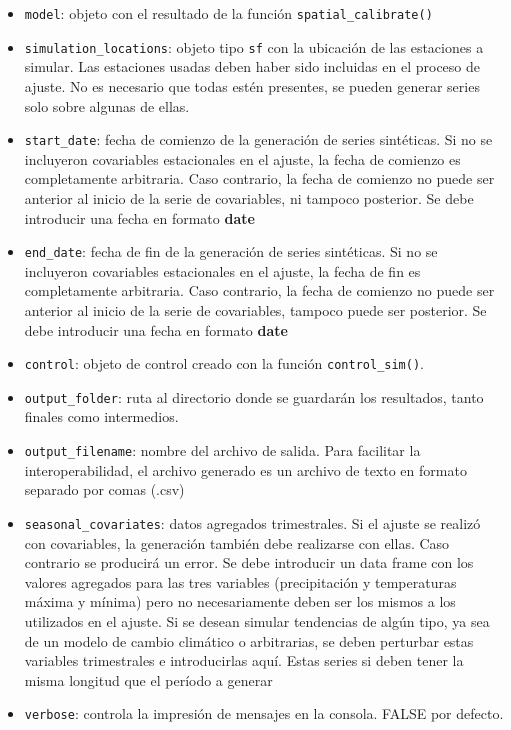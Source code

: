 \documentclass[
  12pt]{article}
\providecommand{\tightlist}{%
  \setlength{\itemsep}{0pt}\setlength{\parskip}{0pt}}
\begin{document}
\begin{itemize}
\tightlist
\item
  \texttt{model}: objeto con el resultado de la función \texttt{spatial\_calibrate()}
\item
  \texttt{simulation\_locations}: objeto tipo \texttt{sf} con la ubicación de las estaciones a simular. Las estaciones usadas deben haber sido incluidas en el proceso de ajuste. No es necesario que todas estén presentes, se pueden generar series solo sobre algunas de ellas.
\item
  \texttt{start\_date}: fecha de comienzo de la generación de series sintéticas. Si no se incluyeron covariables estacionales en el ajuste, la fecha de comienzo es completamente arbitraria. Caso contrario, la fecha de comienzo no puede ser anterior al inicio de la serie de covariables, ni tampoco posterior. Se debe introducir una fecha en formato \textbf{date}
\item
  \texttt{end\_date}: fecha de fin de la generación de series sintéticas. Si no se incluyeron covariables estacionales en el ajuste, la fecha de fin es completamente arbitraria. Caso contrario, la fecha de comienzo no puede ser anterior al inicio de la serie de covariables, tampoco puede ser posterior. Se debe introducir una fecha en formato \textbf{date}
\item
  \texttt{control}: objeto de control creado con la función \texttt{control\_sim()}.
\item
  \texttt{output\_folder}: ruta al directorio donde se guardarán los resultados, tanto finales como intermedios.
\item
  \texttt{output\_filename}: nombre del archivo de salida. Para facilitar la interoperabilidad, el archivo generado es un archivo de texto en formato separado por comas (.csv)
\item
  \texttt{seasonal\_covariates}: datos agregados trimestrales. Si el ajuste se realizó con covariables, la generación también debe realizarse con ellas. Caso contrario se producirá un error. Se debe introducir un data frame con los valores agregados para las tres variables (precipitación y temperaturas máxima y mínima) pero no necesariamente deben ser los mismos a los utilizados en el ajuste. Si se desean simular tendencias de algún tipo, ya sea de un modelo de cambio climático o arbitrarias, se deben perturbar estas variables trimestrales e introducirlas aquí. Estas series si deben tener la misma longitud que el período a generar
\item
  \texttt{verbose}: controla la impresión de mensajes en la consola. FALSE por defecto.
\end{itemize}
\end{document}
